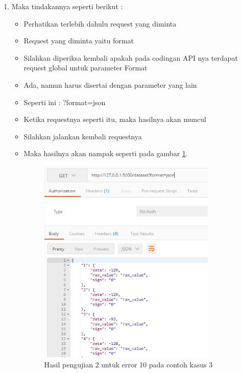 \begin{enumerate}
\item Maka tindakannya seperti berikut	:
\begin{itemize}
\item Perhatikan terlebih dahulu request yang diminta
\item Request yang diminta yaitu format
\item Silahkan diperiksa kembali apakah pada codingan API nya terdapat request global untuk parameter Format
\item Ada, namun harus disertai dengan parameter yang lain
\item Seperti ini : ?format=json
\item Ketika requestnya seperti itu, maka hasilnya akan muncul
\item Silahkan jalankan kembali requestnya
\item Maka hasilnya akan nampak seperti pada gambar \ref{fig:hu2}.
\begin{figure}[!htbp]
	\centerline{\includegraphics[width=0.85\textwidth]{figures/10/hu2.PNG}}
	\caption{Hasil pengujian 2 untuk error 10 pada contoh kasus 3}
	\label{fig:hu2}
\end{figure}
\end{itemize}
\end{enumerate}

